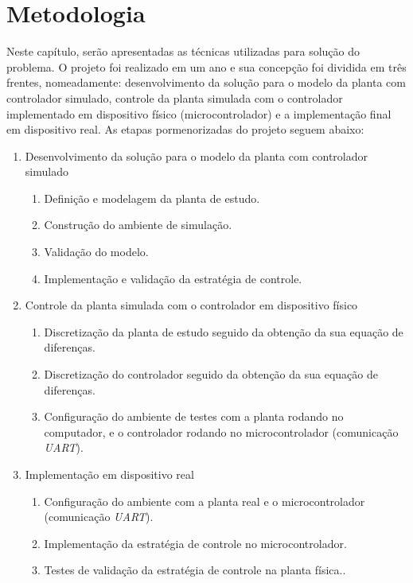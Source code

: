 \chapter{Metodologia}

Neste capítulo, serão apresentadas as técnicas utilizadas para solução do problema. O projeto 
foi realizado em um ano e sua concepção foi dividida em três frentes, nomeadamente: desenvolvimento 
da solução para o modelo da planta com controlador simulado, controle da planta simulada com o 
controlador implementado em dispositivo físico (microcontrolador) e a implementação final em dispositivo real. 
As etapas pormenorizadas do projeto seguem abaixo:

\begin{enumerate}
 \item Desenvolvimento da solução para o modelo da planta com controlador simulado
  \begin{enumerate}
    \item Definição e modelagem da planta de estudo.
    \item Construção do ambiente de simulação.
    \item Validação do modelo.
    \item Implementação e validação da estratégia de controle.
  \end{enumerate}
 \item Controle da planta simulada com o controlador em dispositivo físico
  \begin{enumerate}
    \item Discretização da planta de estudo seguido da obtenção da sua equação de diferenças.
    \item Discretização do controlador seguido da obtenção da sua equação de diferenças.
    \item Configuração do ambiente de testes com a planta rodando no computador, e o 
    controlador rodando no microcontrolador (comunicação \textit{UART}).
  \end{enumerate}
  \item Implementação em dispositivo real
  \begin{enumerate}
    \item Configuração do ambiente com a planta real e o microcontrolador (comunicação \textit{UART}).
    \item Implementação da estratégia de controle no microcontrolador.
    \item Testes de validação da estratégia de controle na planta física..
  \end{enumerate}
\end{enumerate}

